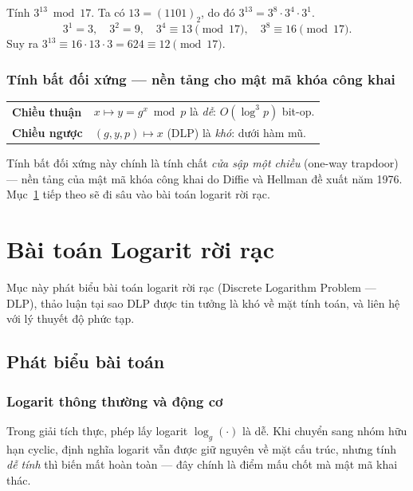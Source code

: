 \documentclass[../DoAn.tex]{subfiles}
\begin{document}
\begin{example}
\label{ex:modexp}
Tính $3^{13} \bmod 17$. Ta có $13 = (1101)_2$, do đó $3^{13} = 3^8 \cdot 3^4 \cdot 3^1$.
\[
3^1 = 3,\quad 3^2 = 9,\quad 3^4 \equiv 13 \pmod{17},\quad 3^8 \equiv 16 \pmod{17}.
\]
Suy ra $3^{13} \equiv 16 \cdot 13 \cdot 3 = 624 \equiv 12 \pmod{17}$.
\end{example}

\subsubsection{Tính bất đối xứng --- nền tảng cho mật mã khóa công khai}

\begin{center}
\renewcommand{\arraystretch}{1.3}
\begin{tabular}{ll}
\toprule
\textbf{Chiều thuận} & $x \longmapsto y = g^x \bmod p$ là \emph{dễ}: $O(\log^3 p)$ bit-op. \\
\textbf{Chiều ngược} & $(g, y, p) \longmapsto x$ (DLP) là \emph{khó}: dưới hàm mũ. \\
\bottomrule
\end{tabular}
\end{center}

Tính bất đối xứng này chính là tính chất \emph{cửa sập một chiều} (one-way trapdoor) --- nền tảng của mật mã khóa công khai do Diffie và Hellman đề xuất năm 1976. Mục~\ref{sec:dlp} tiếp theo sẽ đi sâu vào bài toán logarit rời rạc.

\section{Bài toán Logarit rời rạc}
\label{sec:dlp}

Mục này phát biểu bài toán logarit rời rạc (Discrete Logarithm Problem --- DLP), thảo luận tại sao DLP được tin tưởng là khó về mặt tính toán, và liên hệ với lý thuyết độ phức tạp.

\subsection{Phát biểu bài toán}
\label{subsec:dlp-statement}

\subsubsection{Logarit thông thường và động cơ}

Trong giải tích thực, phép lấy logarit $\log_g(\cdot)$ là dễ. Khi chuyển sang nhóm hữu hạn cyclic, định nghĩa logarit vẫn được giữ nguyên về mặt cấu trúc, nhưng tính \emph{dễ tính} thì biến mất hoàn toàn --- đây chính là điểm mấu chốt mà mật mã khai thác.
\end{document}
